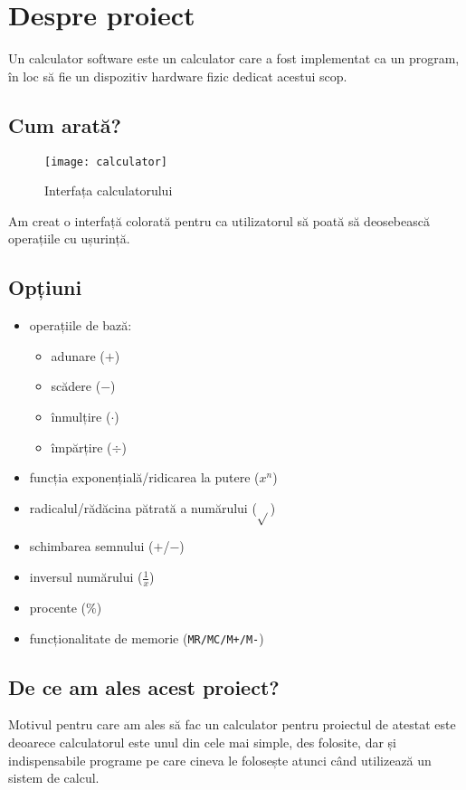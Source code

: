 \section{Despre proiect}
Un calculator software este un calculator care a fost implementat ca un program, în loc să fie un dispozitiv hardware fizic dedicat acestui scop.

\subsection{Cum arată?}
\begin{figure}[H]
 \begin{center}
  \texttt{[image: calculator]}
 \end{center}
 \caption{Interfața calculatorului}
 \label{fig: Interfața programului}
\end{figure}

Am creat o interfață colorată pentru ca utilizatorul să poată să deosebească operațiile cu ușurință.
\subsection{Opțiuni}
\begin{itemize}
 \item operațiile de bază:
 \begin{itemize}
  \item adunare ($+$)
  \item scădere ($-$)
  \item înmulțire ($\cdot$)
  \item împărțire ($\div$)
 \end{itemize}
\item funcția exponențială/ridicarea la putere ($x^n$)
\item radicalul/rădăcina pătrată a numărului ($\sqrt{}$)
\item schimbarea semnului ($+$/$-$)
\item inversul numărului ($\frac{1}{x}$)
\item procente ($\%$)
\item funcționalitate de memorie (\texttt{MR/MC/M+/M-})
\end{itemize}


\subsection{De ce am ales acest proiect?}
Motivul pentru care am ales să fac un calculator pentru proiectul de atestat este deoarece calculatorul este unul din cele mai simple, des folosite, dar și indispensabile programe pe care cineva le folosește atunci când utilizează un sistem de calcul.




